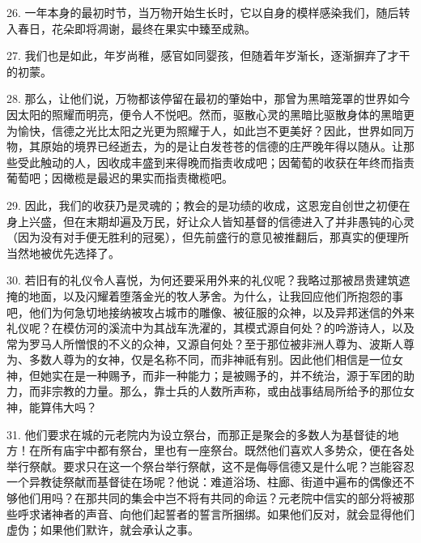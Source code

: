 26. 一年本身的最初时节，当万物开始生长时，它以自身的模样感染我们，随后转入春日，花朵即将凋谢，最终在果实中臻至成熟。\par

27. 我们也是如此，年岁尚稚，感官如同婴孩，但随着年岁渐长，逐渐摒弃了才干的初蒙。\par

28. 那么，让他们说，万物都该停留在最初的肇始中，那曾为黑暗笼罩的世界如今因太阳的照耀而明亮，便令人不悦吧。然而，驱散心灵的黑暗比驱散身体的黑暗更为愉快，信德之光比太阳之光更为照耀于人，如此岂不更美好？因此，世界如同万物，其原始的境界已经逝去，为的是让白发苍苍的信德的庄严晚年得以随从。让那些受此触动的人，因收成丰盛到来得晚而指责收成吧；因葡萄的收获在年终而指责葡萄吧；因橄榄是最迟的果实而指责橄榄吧。\par

29. 因此，我们的收获乃是灵魂的；教会的是功绩的收成，这恩宠自创世之初便在身上兴盛，但在末期却遍及万民，好让众人皆知基督的信德进入了并非愚钝的心灵（因为没有对手便无胜利的冠冕），但先前盛行的意见被推翻后，那真实的便理所当然地被优先选择了。\par

30. 若旧有的礼仪令人喜悦，为何还要采用外来的礼仪呢？我略过那被昂贵建筑遮掩的地面，以及闪耀着堕落金光的牧人茅舍。为什么，让我回应他们所抱怨的事吧，他们为何急切地接纳被攻占城市的雕像、被征服的众神，以及异邦迷信的外来礼仪呢？在模仿河的溪流中为其战车洗濯的，其模式源自何处？的吟游诗人，以及常为罗马人所憎恨的不义的众神，又源自何处？至于那位被非洲人尊为、波斯人尊为、多数人尊为的女神，仅是名称不同，而非神祇有别。因此他们相信是一位女神，但她实在是一种赐予，而非一种能力；是被赐予的，并不统治，源于军团的助力，而非宗教的力量。那么，靠士兵的人数所声称，或由战事结局所给予的那位女神，能算伟大吗？\par

31. 他们要求在城的元老院内为设立祭台，而那正是聚会的多数人为基督徒的地方！在所有庙宇中都有祭台，里也有一座祭台。既然他们喜欢人多势众，便在各处举行祭献。要求只在这一个祭台举行祭献，这不是侮辱信德又是什么呢？岂能容忍一个异教徒祭献而基督徒在场呢？他说：难道浴场、柱廊、街道中遍布的偶像还不够他们用吗？在那共同的集会中岂不将有共同的命运？元老院中信实的部分将被那些呼求诸神者的声音、向他们起誓者的誓言所捆绑。如果他们反对，就会显得他们虚伪；如果他们默许，就会承认之事。\par

